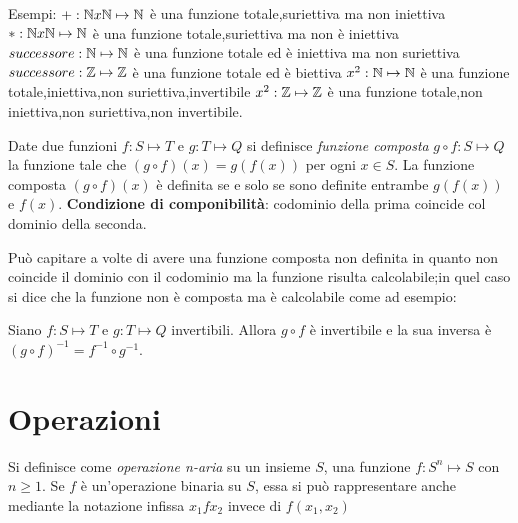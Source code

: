 Esempi:\newline
$+:\mathbb{N} x \mathbb{N} \mapsto \mathbb{N}$ è una funzione totale,suriettiva ma non iniettiva \newline
$*:\mathbb{N} x \mathbb{N} \mapsto \mathbb{N}$ è una funzione totale,suriettiva ma non è iniettiva \newline
$successore:\mathbb{N} \mapsto \mathbb{N}$ è una funzione totale ed è iniettiva ma non suriettiva \newline
$successore:\mathbb{Z} \mapsto \mathbb{Z}$ è una funzione totale ed è biettiva \newline
$x^2:\mathbb{N} \mapsto \mathbb{N}$ è una funzione totale,iniettiva,non suriettiva,invertibile \newline
$x^2:\mathbb{Z} \mapsto \mathbb{Z}$ è una funzione totale,non iniettiva,non suriettiva,non invertibile. \newline

Date due funzioni $f:S \mapsto T$ e $g:T \mapsto Q$ si definisce \emph{funzione composta}
$g \circ f:S \mapsto Q$ la funzione tale che $(g \circ f)(x) = g(f(x))$ per ogni $x \in S$.
La funzione composta $(g \circ f)(x)$ è definita se e solo se sono definite entrambe
$g(f(x))$ e $f(x)$.\newline
\textbf{Condizione di componibilità}: codominio della prima coincide col dominio della seconda.

Può capitare a volte di avere una funzione composta non definita in quanto non coincide
il dominio con il codominio ma la funzione risulta calcolabile;in quel caso si dice
che la funzione non è composta ma è calcolabile come ad esempio:


\begin{thm}
Siano $f:S \mapsto T$ e $g:T \mapsto Q$ invertibili. Allora $g \circ f$ è invertibile
e la sua inversa è $(g \circ f) ^{-1} = f^{-1} \circ g ^{-1}$.
\end{thm}

\section{Operazioni}
Si definisce come \emph{operazione n-aria} su un insieme $S$, una funzione
$f:S^n \mapsto S$ con $n \geq 1$.
Se $f$ è un'operazione binaria su $S$, essa si può rappresentare anche mediante
la notazione infissa $x_1 f x_2$ invece di $f(x_1,x_2)$


